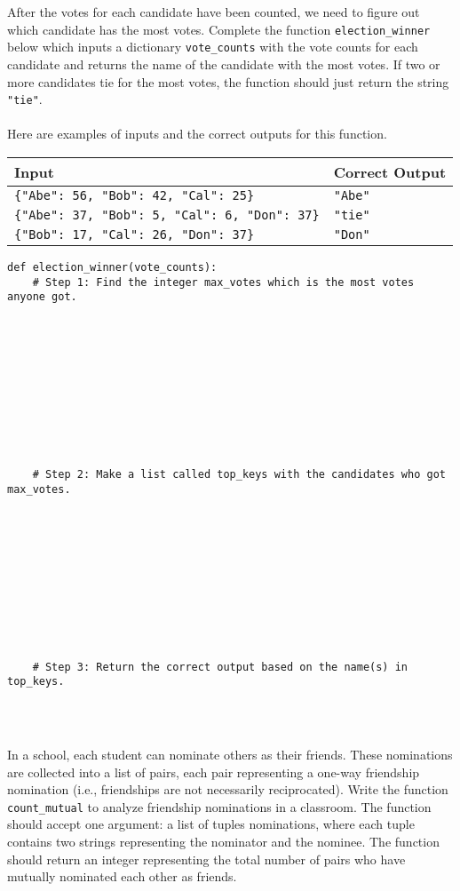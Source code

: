 \documentclass[12pt]{exam}
\begin{document}
\begin{questions}
\newpage
\question After the votes for each candidate have been counted, we need to figure out which candidate has the most votes. Complete the function \verb|election_winner| below which inputs a dictionary \verb|vote_counts| with the vote counts for each candidate and returns the name of the candidate with the most votes.  If two or more candidates tie for the most votes, the function should just return the string \verb|"tie"|. \\ \\
Here are examples of inputs and the correct outputs for this function.

\begin{tabular}{|l|l|}
\hline
\textbf{Input} & \textbf{Correct Output} \\ \hline
\verb|{"Abe": 56, "Bob": 42, "Cal": 25}| & \verb|"Abe"| \hspace*{1in} \\ \hline
\verb|{"Abe": 37, "Bob": 5, "Cal": 6, "Don": 37}| & \verb|"tie"| \hspace*{1in} \\ \hline
\verb|{"Bob": 17, "Cal": 26, "Don": 37}| & \verb|"Don"| \hspace*{1in} \\ \hline
\end{tabular}

\begin{verbatim}
def election_winner(vote_counts):
    # Step 1: Find the integer max_votes which is the most votes anyone got.











    # Step 2: Make a list called top_keys with the candidates who got max_votes. 









      

    # Step 3: Return the correct output based on the name(s) in top_keys. 




\end{verbatim}
\vfill

\newpage
\question In a school, each student can nominate others as their friends. These nominations are collected into a
list of pairs, each pair representing a one-way friendship nomination (i.e., friendships are not necessarily
reciprocated). Write the function \verb|count_mutual| to analyze friendship nominations in a classroom. The
function should accept one argument: a list of tuples nominations, where each tuple contains two strings
representing the nominator and the nominee. The function should return an integer representing the total
number of pairs who have mutually nominated each other as friends.


\end{questions}
\end{document}
